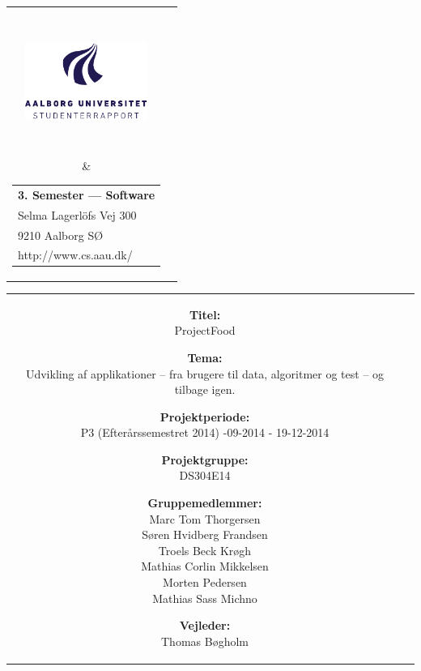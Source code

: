 \thispagestyle{empty}
\enlargethispage*{\ifcounts 4\else 2\fi\baselineskip}
{\samepage
\begin{tabular}{cc}
  \parbox{0.5\textwidth}{ %
    \hspace*{1cm} %
    \includegraphics[width=4cm,height=4cm,keepaspectratio]{images/aau_logo_da.pdf}} &
  \parbox{0.5\textwidth}{\begin{tabular}{l}
      {\small \textbf{3. Semester --- Software}}\\
      {\small Selma Lagerlöfs Vej 300} \\
      {\small 9210 Aalborg SØ} \\
      {\small http://www.cs.aau.dk/}
    \end{tabular}}
\end{tabular}

\begin{tabular}{cc}
  \parbox{8cm}{
  \begin{description}
    \item { \textbf{Titel:}}\\ 
      ProjectFood
    \item { \textbf{Tema:}}\\ 
      Udvikling af applikationer – fra brugere til data, algoritmer og test – og tilbage igen. 
  \end{description}
  
  \parbox{8cm}{
  \begin{description}
    \item { \textbf{Projektperiode:}}\\
      P3 (Efterårssemestret 2014) -09-2014 - 19-12-2014
    \hspace{4cm}
    \item { \textbf{Projektgruppe:}}\\
        DS304E14
    \hspace{4cm}
    \item {\textbf{Gruppemedlemmer:}}\\
      Marc Tom Thorgersen\\
      Søren Hvidberg Frandsen\\
      Troels Beck Krøgh\\
      Mathias Corlin Mikkelsen\\
      Morten Pedersen\\
      Mathias Sass Michno\\
    \hspace{2cm}
    \item { \textbf{Vejleder:}}\\
      Thomas Bøgholm\\
    \end{description}
  }

}
\end{tabular}}
